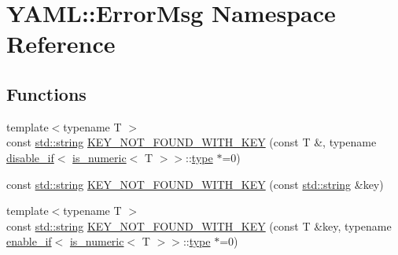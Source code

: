 \hypertarget{namespace_y_a_m_l_1_1_error_msg}{}\section{Y\+A\+ML\+::Error\+Msg Namespace Reference}
\label{namespace_y_a_m_l_1_1_error_msg}
\subsection*{Functions}
\begin{DoxyCompactItemize}
\item 
{\footnotesize template$<$typename T $>$ }\\const \mbox{\hyperlink{glad_8h_ac83513893df92266f79a515488701770}{std\+::string}} \mbox{\hyperlink{namespace_y_a_m_l_1_1_error_msg_afa3413b7b43dffb46551048eefd2a7ed}{K\+E\+Y\+\_\+\+N\+O\+T\+\_\+\+F\+O\+U\+N\+D\+\_\+\+W\+I\+T\+H\+\_\+\+K\+EY}} (const T \&, typename \mbox{\hyperlink{struct_y_a_m_l_1_1disable__if}{disable\+\_\+if}}$<$ \mbox{\hyperlink{struct_y_a_m_l_1_1is__numeric}{is\+\_\+numeric}}$<$ T $>$$>$\+::\mbox{\hyperlink{glad_8h_a890efa53b3d7deeeced6f3a0d6653ed3}{type}} $\ast$=0)
\item 
const \mbox{\hyperlink{glad_8h_ac83513893df92266f79a515488701770}{std\+::string}} \mbox{\hyperlink{namespace_y_a_m_l_1_1_error_msg_a0b54f28d4dde5446cff6430ef9fee9ab}{K\+E\+Y\+\_\+\+N\+O\+T\+\_\+\+F\+O\+U\+N\+D\+\_\+\+W\+I\+T\+H\+\_\+\+K\+EY}} (const \mbox{\hyperlink{glad_8h_ac83513893df92266f79a515488701770}{std\+::string}} \&key)
\item 
{\footnotesize template$<$typename T $>$ }\\const \mbox{\hyperlink{glad_8h_ac83513893df92266f79a515488701770}{std\+::string}} \mbox{\hyperlink{namespace_y_a_m_l_1_1_error_msg_a19b61547afc305b9010cf09ab5ff2805}{K\+E\+Y\+\_\+\+N\+O\+T\+\_\+\+F\+O\+U\+N\+D\+\_\+\+W\+I\+T\+H\+\_\+\+K\+EY}} (const T \&key, typename \mbox{\hyperlink{struct_y_a_m_l_1_1enable__if}{enable\+\_\+if}}$<$ \mbox{\hyperlink{struct_y_a_m_l_1_1is__numeric}{is\+\_\+numeric}}$<$ T $>$$>$\+::\mbox{\hyperlink{glad_8h_a890efa53b3d7deeeced6f3a0d6653ed3}{type}} $\ast$=0)
\end{DoxyCompactItemize}
